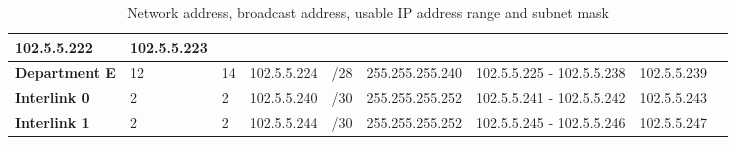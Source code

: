 \documentclass[a4paper,11pt]{article}
\begin{document}
\begin{A}
{\begin{table}[H]
\begin{tabular}{ m{8em}| m{3em}| m{4em}| m{5em}| m{2em}| m{7em}| m{5em}| m{5em}| m{5em}|}
                102.5.5.222                                                 & 102.5.5.223                                                                                                                                                                 \\
                \hline
                {\cellcolor[rgb]{0.129,0.816,0.557}}\textbf{ Department E } & 12                     & 14                        & 102.5.5.224               & /28             & 255.255.255.240     & 102.5.5.225 -
                102.5.5.238                                                 & 102.5.5.239                                                                                                                                                                 \\
                \hline
                {\cellcolor[rgb]{0.129,0.816,0.557}}\textbf{ Interlink 0 }  & 2                      & 2                         & 102.5.5.240               & /30             & 255.255.255.252     & 102.5.5.241 -
                102.5.5.242                                                 & 102.5.5.243                                                                                                                                                                 \\
                \hline
                {\cellcolor[rgb]{0.129,0.816,0.557}}\textbf{ Interlink 1 }  & 2                      & 2                         & 102.5.5.244               & /30             & 255.255.255.252     & 102.5.5.245 -
                102.5.5.246                                                 & 102.5.5.247                                                                                                                                                                 \\
                \bottomrule
            \end{tabular}
            \caption{Network address, broadcast address, usable IP address range and
                subnet mask}
        \end{table}
    }
\end{A}
\end{document}
